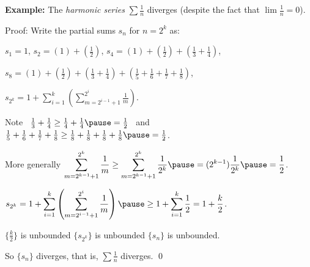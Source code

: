 \documentclass[10pt,aspectratio=149]{beamer}
\begin{document}
\begin{frame}

\textbf{Example:}
The \emph{harmonic series} $\sum \frac{1}{n}$ diverges (despite the fact that $\lim
\frac{1}{n} = 0$).

\pause
\medskip

Proof:
Write the partial sums $s_n$ for $n = 2^k$ as:

\pause
\medskip

$s_1 = 1$, \qquad
\pause
$s_2 = \left( 1 \right) + \left( \frac{1}{2} \right)$, \qquad 
\pause
$s_4 = \left( 1 \right) + \left( \frac{1}{2} \right) +
        \left( \frac{1}{3} + \frac{1}{4} \right)$,

\pause
\medskip

$s_8 = \left( 1 \right) + \left( \frac{1}{2} \right) +
        \left( \frac{1}{3} + \frac{1}{4} \right) +
        \left( \frac{1}{5} + \frac{1}{6} + \frac{1}{7} + \frac{1}{8}
\right)$,

\pause
\medskip

$\displaystyle s_{2^k} = 
1 + 
\sum_{i=1}^k
\left(
\sum_{m=2^{i-1}+1}^{2^i} \frac{1}{m}
\right)$.

\pause
\medskip

Note
~$\frac{1}{3} + \frac{1}{4} \geq \frac{1}{4} + \frac{1}{4}
\pause
=
\frac{1}{2}$~
\pause
and
~$\frac{1}{5} + \frac{1}{6} + \frac{1}{7} + \frac{1}{8}
\geq \frac{1}{8} + \frac{1}{8} + \frac{1}{8} + \frac{1}{8}
\pause
=
\frac{1}{2}$.

\pause
\medskip

More generally
\quad
$\displaystyle
\sum_{m=2^{k-1}+1}^{2^k} \frac{1}{m}
\geq
\sum_{m=2^{k-1}+1}^{2^k} \frac{1}{2^k}
\pause
=
(2^{k-1}) \frac{1}{2^k}
\pause
=
\frac{1}{2}$.

\pause
\medskip

\thus \quad
$\displaystyle
s_{2^k} = 
1 + 
\sum_{i=1}^k
\left(
\sum_{m=2^{i-1}+1}^{2^i} \frac{1}{m}
\right) 
\pause
\geq
1 + \sum_{i=1}^k \frac{1}{2} = 1 + \frac{k}{2}$.

\pause
\medskip

$\{ \frac{k}{2} \}$ is unbounded
\pause
\wthus
$\{ s_{2^k} \}$ is unbounded
\pause
\wthus $\{ s_n \}$ is unbounded.

\medskip

So $\{ s_n \}$ diverges, that is, $\sum \frac{1}{n}$ diverges.
\qed

\end{frame}
\end{document}
